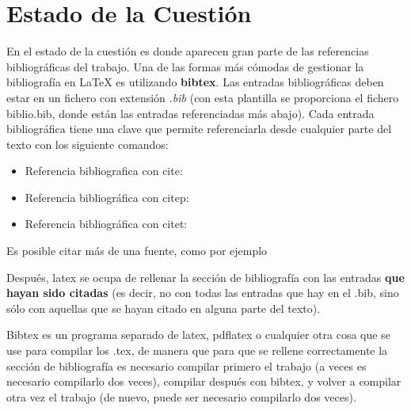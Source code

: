 \chapter{Estado de la Cuestión}
\label{cap:estadoDeLaCuestion}

En el estado de la cuestión es donde aparecen gran parte de las referencias bibliográficas del trabajo. Una de las formas más cómodas de gestionar la bibliografía en {\LaTeX} es utilizando \textbf{bibtex}. Las entradas bibliográficas deben estar en un fichero con extensión \textit{.bib} (con esta plantilla se proporciona el fichero biblio.bib, donde están las entradas referenciadas más abajo). Cada entrada bibliográfica tiene una clave que permite referenciarla desde cualquier parte del texto con los siguiente comandos:

\begin{itemize}
\item Referencia bibliografica con cite: \cite{ldesc2e}
\item Referencia bibliográfica con citep: \citep{notsoshort}
\item Referencia bibliográfica con citet: \citet{latexAPrimer}
\end{itemize}

Es posible citar más de una fuente, como por ejemplo \citep{latexCompanion,LaTeXLamport,texKnuth}

Después, latex se ocupa de rellenar la sección de bibliografía con las entradas \textbf{que hayan sido citadas} (es decir, no con todas las entradas que hay en el .bib, sino sólo con aquellas que se hayan citado en alguna parte del texto).

Bibtex es un programa separado de latex, pdflatex o cualquier otra cosa que se use para compilar los .tex, de manera que para que se rellene correctamente la sección de bibliografía es necesario compilar primero el trabajo (a veces es necesario compilarlo dos veces), compilar después con bibtex, y volver a compilar otra vez el trabajo (de nuevo, puede ser necesario compilarlo dos veces). 
